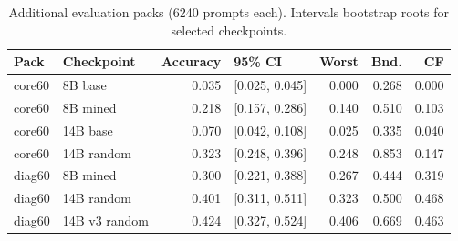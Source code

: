 \begin{table}[t]
\caption{Additional evaluation packs (6240 prompts each). Intervals bootstrap roots for selected checkpoints.}\label{t:packs}
\centering\small
\setlength{\tabcolsep}{4pt}
\begin{tabular}{llrlrrr}
\toprule
Pack & Checkpoint & Accuracy & 95\% CI & Worst & Bnd. & CF\\\midrule
core60 & 8B base & 0.035 & [0.025, 0.045] & 0.000 & 0.268 & 0.000\\
core60 & 8B mined & 0.218 & [0.157, 0.286] & 0.140 & 0.510 & 0.103\\
core60 & 14B base & 0.070 & [0.042, 0.108] & 0.025 & 0.335 & 0.040\\
core60 & 14B random & 0.323 & [0.248, 0.396] & 0.248 & 0.853 & 0.147\\
diag60 & 8B mined & 0.300 & [0.221, 0.388] & 0.267 & 0.444 & 0.319\\
diag60 & 14B random & 0.401 & [0.311, 0.511] & 0.323 & 0.500 & 0.468\\
diag60 & 14B v3 random & 0.424 & [0.327, 0.524] & 0.406 & 0.669 & 0.463\\
\bottomrule
\end{tabular}
\end{table}
